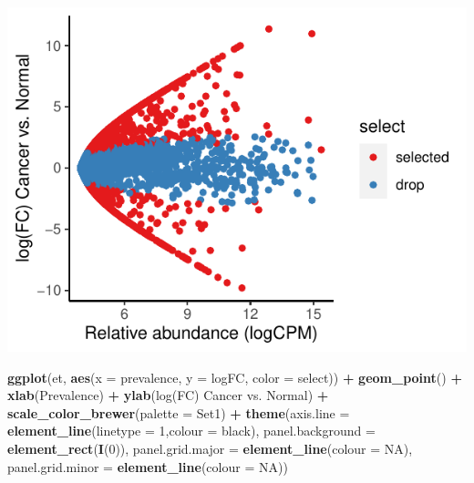 \documentclass[
]{article}
\newenvironment{Shaded}{\begin{snugshade}}{\end{snugshade}}
\newcommand{\AttributeTok}[1]{\textcolor[rgb]{0.13,0.29,0.53}{#1}}
\newcommand{\ConstantTok}[1]{\textcolor[rgb]{0.56,0.35,0.01}{#1}}
\newcommand{\DecValTok}[1]{\textcolor[rgb]{0.00,0.00,0.81}{#1}}
\newcommand{\FunctionTok}[1]{\textcolor[rgb]{0.13,0.29,0.53}{\textbf{#1}}}
\newcommand{\NormalTok}[1]{#1}
\newcommand{\SpecialCharTok}[1]{\textcolor[rgb]{0.81,0.36,0.00}{\textbf{#1}}}
\newcommand{\StringTok}[1]{\textcolor[rgb]{0.31,0.60,0.02}{#1}}
\begin{document}
\includegraphics{workshop_files/figure-latex/unnamed-chunk-51-2.pdf}

\begin{Shaded}
\begin{Highlighting}[]

\FunctionTok{ggplot}\NormalTok{(et, }\FunctionTok{aes}\NormalTok{(}\AttributeTok{x =}\NormalTok{ prevalence, }\AttributeTok{y =}\NormalTok{ logFC, }\AttributeTok{color =}\NormalTok{ select)) }\SpecialCharTok{+} \FunctionTok{geom\_point}\NormalTok{() }\SpecialCharTok{+}
  \FunctionTok{xlab}\NormalTok{(}\StringTok{\textquotesingle{}Prevalence\textquotesingle{}}\NormalTok{) }\SpecialCharTok{+} \FunctionTok{ylab}\NormalTok{(}\StringTok{\textquotesingle{}log(FC) Cancer vs. Normal\textquotesingle{}}\NormalTok{) }\SpecialCharTok{+} 
  \FunctionTok{scale\_color\_brewer}\NormalTok{(}\AttributeTok{palette =} \StringTok{\textquotesingle{}Set1\textquotesingle{}}\NormalTok{) }\SpecialCharTok{+}
  \FunctionTok{theme}\NormalTok{(}\AttributeTok{axis.line =} \FunctionTok{element\_line}\NormalTok{(}\AttributeTok{linetype =} \DecValTok{1}\NormalTok{,}\AttributeTok{colour =} \StringTok{\textquotesingle{}black\textquotesingle{}}\NormalTok{),}
        \AttributeTok{panel.background =} \FunctionTok{element\_rect}\NormalTok{(}\FunctionTok{I}\NormalTok{(}\DecValTok{0}\NormalTok{)),}
        \AttributeTok{panel.grid.major =} \FunctionTok{element\_line}\NormalTok{(}\AttributeTok{colour =} \ConstantTok{NA}\NormalTok{),}
        \AttributeTok{panel.grid.minor =} \FunctionTok{element\_line}\NormalTok{(}\AttributeTok{colour =} \ConstantTok{NA}\NormalTok{))}
\end{Highlighting}
\end{Shaded}
\end{document}
